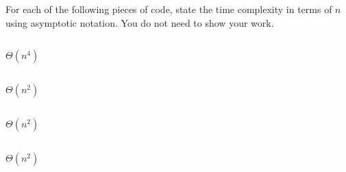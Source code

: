 \begin{prob}
    For each of the following pieces of code, state the time complexity in terms of $n$
    using asymptotic notation. You do not need to show your work.

    \begin{subprobset}

        \begin{subprob}
            \inputminted{python}{\thisdir/include/part_a.py}

            \begin{soln}
                    $\Theta(n^4)$
            \end{soln}
        \end{subprob}

        \begin{subprob}
            \inputminted{python}{\thisdir/include/part_b.py}

            \begin{soln}
                $\Theta(n^2)$
            \end{soln}
        \end{subprob}

        \begin{subprob}
            \inputminted{python}{\thisdir/include/part_c.py}

            \begin{soln}
                $\Theta(n^2)$
            \end{soln}

        \end{subprob}

        \begin{subprob}
            \inputminted{python}{\thisdir/include/part_d.py}

            \begin{soln}
                $\Theta(n^2)$
            \end{soln}

        \end{subprob}

        \begin{subprob}
            \inputminted{python}{\thisdir/include/part_e.py}
            

\end{subprob}
\end{subprobset}
\end{prob}
